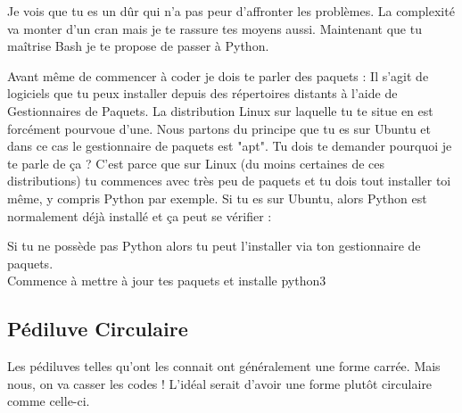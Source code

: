 \documentclass[a4paper, 12pt]{article}
\begin{document}
{\comfortaa
    Je vois que tu es un dûr qui n'a pas peur d'affronter les problèmes.
    La complexité va monter d'un cran mais je te rassure tes moyens aussi.
    \newline \newline
    Maintenant que tu maîtrise Bash je te propose de passer à Python.

    Avant même de commencer à coder je dois te parler des paquets :
    \newline \newline
    Il s'agit de logiciels que tu peux installer depuis des répertoires distants à l'aide
    de Gestionnaires de Paquets. La distribution Linux sur laquelle tu te situe en est
    forcément pourvoue d'une. Nous partons du principe que tu es sur Ubuntu et dans ce
    cas le gestionnaire de paquets est "apt". 
    \newline\newline
    Tu dois te demander pourquoi je te parle de ça ?
    \newline
    C'est parce que sur Linux (du moins certaines de ces distributions) tu commences avec très
    peu de paquets et tu dois tout installer toi même, y compris Python par exemple.
    \newline \newline
    Si tu es sur Ubuntu, alors Python est normalement déjà installé et ça peut se vérifier :


    Si tu ne possède pas Python alors tu peut l'installer via ton gestionnaire de paquets. \\
    Commence à mettre à jour tes paquets et installe python3


    \vspace{3cm}

    \subsection{Pédiluve Circulaire}

    Les pédiluves telles qu'ont les connait ont généralement une forme carrée. Mais
    nous, on va casser les codes !
    L'idéal serait d'avoir une forme plutôt circulaire comme celle-ci.
    
}
\end{document}
